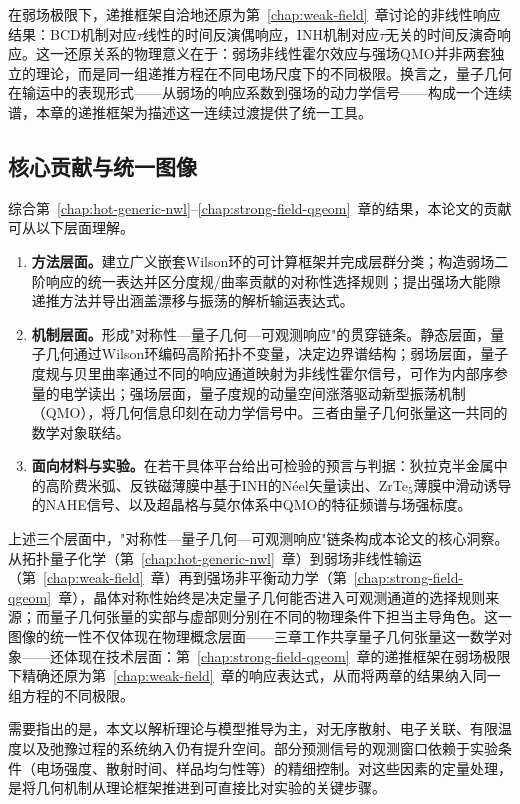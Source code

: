在弱场极限下，递推框架自洽地还原为第~\ref{chap:weak-field}~章讨论的非线性响应结果：BCD机制对应$\tau$线性的时间反演偶响应，INH机制对应$\tau$无关的时间反演奇响应。这一还原关系的物理意义在于：弱场非线性霍尔效应与强场QMO并非两套独立的理论，而是同一组递推方程在不同电场尺度下的不同极限。换言之，量子几何在输运中的表现形式——从弱场的响应系数到强场的动力学信号——构成一个连续谱，本章的递推框架为描述这一连续过渡提供了统一工具。

\subsection{核心贡献与统一图像}

综合第~\ref{chap:hot-generic-nwl}--\ref{chap:strong-field-qgeom}~章的结果，本论文的贡献可从以下层面理解。

\begin{enumerate}
  \item \textbf{方法层面。}建立广义嵌套Wilson环的可计算框架并完成层群分类；构造弱场二阶响应的统一表达并区分度规/曲率贡献的对称性选择规则；提出强场大能隙递推方法并导出涵盖漂移与振荡的解析输运表达式。
  \item \textbf{机制层面。}形成"对称性—量子几何—可观测响应"的贯穿链条。静态层面，量子几何通过Wilson环编码高阶拓扑不变量，决定边界谱结构；弱场层面，量子度规与贝里曲率通过不同的响应通道映射为非线性霍尔信号，可作为内部序参量的电学读出；强场层面，量子度规的动量空间涨落驱动新型振荡机制（QMO），将几何信息印刻在动力学信号中。三者由量子几何张量这一共同的数学对象联结。
  \item \textbf{面向材料与实验。}在若干具体平台给出可检验的预言与判据：狄拉克半金属中的高阶费米弧、反铁磁薄膜中基于INH的Néel矢量读出、ZrTe$_5$薄膜中滑动诱导的NAHE信号、以及超晶格与莫尔体系中QMO的特征频谱与场强标度。
\end{enumerate}

上述三个层面中，"对称性—量子几何—可观测响应"链条构成本论文的核心洞察。从拓扑量子化学（第~\ref{chap:hot-generic-nwl}~章）到弱场非线性输运（第~\ref{chap:weak-field}~章）再到强场非平衡动力学（第~\ref{chap:strong-field-qgeom}~章），晶体对称性始终是决定量子几何能否进入可观测通道的选择规则来源；而量子几何张量的实部与虚部则分别在不同的物理条件下担当主导角色。这一图像的统一性不仅体现在物理概念层面——三章工作共享量子几何张量这一数学对象——还体现在技术层面：第~\ref{chap:strong-field-qgeom}~章的递推框架在弱场极限下精确还原为第~\ref{chap:weak-field}~章的响应表达式，从而将两章的结果纳入同一组方程的不同极限。

需要指出的是，本文以解析理论与模型推导为主，对无序散射、电子关联、有限温度以及弛豫过程的系统纳入仍有提升空间。部分预测信号的观测窗口依赖于实验条件（电场强度、散射时间、样品均匀性等）的精细控制。对这些因素的定量处理，是将几何机制从理论框架推进到可直接比对实验的关键步骤。

